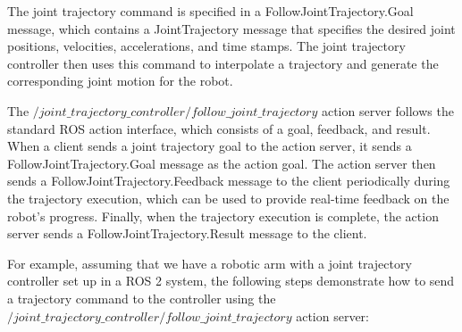 \documentclass[12pt,oneside]{article}
\begin{document}
The joint trajectory command is specified in a FollowJointTrajectory.Goal message, which contains a JointTrajectory message that specifies the desired joint positions, velocities, accelerations, and time stamps. The joint trajectory controller then uses this command to interpolate a trajectory and generate the corresponding joint motion for the robot.

The $/joint\_trajectory\_controller/follow\_joint\_trajectory$ action server follows the standard ROS action interface, which consists of a goal, feedback, and result. When a client sends a joint trajectory goal to the action server, it sends a FollowJointTrajectory.Goal message as the action goal. The action server then sends a FollowJointTrajectory.Feedback message to the client periodically during the trajectory execution, which can be used to provide real-time feedback on the robot's progress. Finally, when the trajectory execution is complete, the action server sends a FollowJointTrajectory.Result message to the client.

For example, assuming that we have a robotic arm with a joint trajectory controller set up in a ROS 2 system, the following steps demonstrate how to send a trajectory command to the controller using the $/joint\_trajectory\_controller/follow\_joint\_trajectory$ action server:
\end{document}
